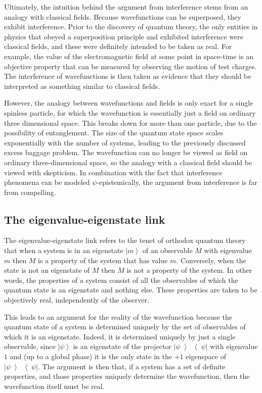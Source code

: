 \documentclass[DIV=calc,fontsize=12pt]{scrartcl} %
\theoremstyle{definition}
\theoremstyle{plain}
\newcommand{\Ket}[1]{\ensuremath{\left \vert #1 \right \rangle}}
\newcommand{\KetBra}[2]{\ensuremath{\left \vert #1 \middle \rangle
\middle \langle #2 \right \vert}}
\begin{document}
Ultimately, the intuition behind the argument from interference stems
from an analogy with classical fields.  Because wavefunctions can be
superposed, they exhibit interference.  Prior to the discovery of
quantum theory, the only entities in physics that obeyed a
superposition principle and exhibited interference were classical
fields, and these were definitely intended to be taken as real.  For
example, the value of the electromagnetic field at some point in
space-time is an objective property that can be measured by observing
the motion of test charges.  The interference of wavefunctions is then
taken as evidence that they should be interpreted as something similar
to classical fields.

However, the analogy between wavefunctions and fields is only exact
for a single spinless particle, for which the wavefunction is
essentially just a field on ordinary three dimensional space.  This
breaks down for more than one particle, due to the possibility of
entanglement.  The size of the quantum state space scales
exponentially with the number of systems, leading to the previously
discussed excess baggage problem.  The wavefunction can no longer be
viewed as field on ordinary three-dimensional space, so the analogy
with a classical field should be viewed with skepticism.  In
combination with the fact that interference phenomena can be modeled
$\psi$-epistemically, the argument from interference is far from
compelling.

\subsection{The eigenvalue-eigenstate link}

\label{EEL}

The eigenvalue-eigenstate link refers to the tenet of orthodox
quantum theory that when a system is in an eigenstate $\Ket{m}$ of an
observable $M$ with eigenvalue $m$ then $M$ is a property of the
system that has value $m$.  Conversely, when the state is not an
eigenstate of $M$ then $M$ is not a property of the system.  In other
words, the properties of a system consist of all the observables of
which the quantum state is an eigenstate and nothing else.  These
properties are taken to be objectively real, independently of the
observer.

This leads to an argument for the reality of the wavefunction because
the quantum state of a system is determined uniquely by the set of
observables of which it is an eigenstate.  Indeed, it is determined
uniquely by just a single observable, since $\Ket{\psi}$ is an
eigenstate of the projector $\KetBra{\psi}{\psi}$ with eigenvalue $1$
and (up to a global phase) it is the only state in the $+1$ eigenspace
of $\KetBra{\psi}{\psi}$.  The argument is then that, if a system has
a set of definite properties, and those properties uniquely determine
the wavefunction, then the wavefunction itself must be real.
\end{document}
